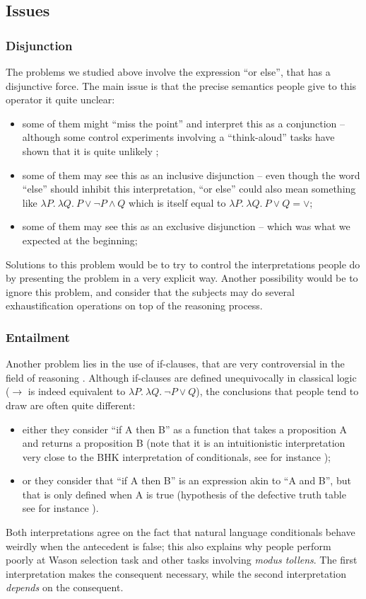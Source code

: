\documentclass[french]{article}
\begin{document}
\subsection{Issues}
\subsubsection{Disjunction}
The problems we studied above involve the expression ``or else'', that has a disjunctive force. The main issue is that the precise semantics people give to this operator it quite unclear:
\begin{itemize}
	\item some of them might ``miss the point'' and interpret this as a conjunction -- although some control experiments involving a ``think-aloud'' tasks have shown that it is quite unlikely \cite{johnsonlaird1999};
	\item some of them may see this as an inclusive disjunction -- even though the word ``else'' should inhibit this interpretation, ``or else'' could also mean something like $\lambda P. \ \lambda Q. \ P \vee \neg P \wedge Q $ which is itself equal to $\lambda P. \ \lambda Q. \ P \vee Q = \vee$;
	\item some of them may see this as an exclusive disjunction -- which was what we expected at the beginning;
\end{itemize} 
Solutions to this problem would be to try to control the interpretations people do by presenting the problem in a very explicit way. Another possibility would be to ignore this problem, and consider that the subjects may do several exhaustification operations on top of the reasoning process.
\subsubsection{Entailment}
Another problem lies in the use of if-clauses, that are very controversial in the field of reasoning \cite{johnsonlaird1999,barrouillet2000}. Although if-clauses are defined unequivocally in classical logic ($\rightarrow$ is indeed equivalent to $\lambda P. \ \lambda Q. \ \neg P \vee Q$), the conclusions that people tend to draw are often quite different:
\begin{itemize}
	\item either they consider ``if A then B'' as a function that takes a proposition A and returns a proposition B (note that it is an intuitionistic interpretation very close to the BHK interpretation of conditionals, see for instance \cite{troelstra1977});
	\item or they consider that ``if A then B'' is an expression akin to ``A and B'', but that is only defined when A is true (hypothesis of the defective truth table see for instance \cite{byrne2009}).
\end{itemize}
Both interpretations agree on the fact that natural language conditionals behave weirdly when the antecedent is false; this also explains why people perform poorly at Wason selection task and other tasks involving \textit{modus tollens}. The first interpretation makes the consequent necessary, while the second interpretation \textit{depends} on the consequent.
\end{document}
